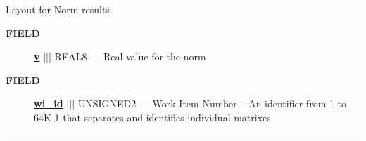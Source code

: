 \par





Layout for Norm results.







\par
\begin{description}
\item [\colorbox{tagtype}{\color{white} \textbf{\textsf{FIELD}}}] \textbf{\underline{v}} ||| REAL8 --- Real value for the norm
\item [\colorbox{tagtype}{\color{white} \textbf{\textsf{FIELD}}}] \textbf{\underline{wi\_id}} ||| UNSIGNED2 --- Work Item Number -- An identifier from 1 to 64K-1 that separates and identifies individual matrixes
\end{description}





\rule{\linewidth}{0.5pt}


